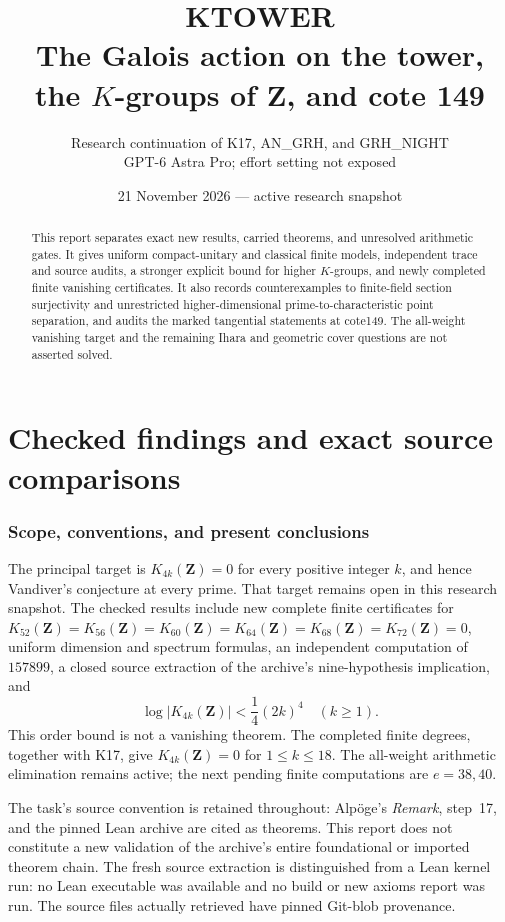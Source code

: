 \documentclass[11pt,a4paper]{article}
\title{KTOWER\\The Galois action on the tower,\\the $K$-groups of $\mathbf Z$, and cote 149}
\author{Research continuation of K17, AN\_GRH, and GRH\_NIGHT\\GPT-6 Astra Pro; effort setting not exposed}
\date{21 November 2026 --- active research snapshot}
\theoremstyle{definition}
\begin{document}
\maketitle
\begin{abstract}
This report separates exact new results, carried theorems, and unresolved
arithmetic gates. It gives uniform compact-unitary and classical finite
models, independent trace and source audits, a stronger explicit bound
for higher $K$-groups, and newly completed finite vanishing certificates.
It also records counterexamples to finite-field section surjectivity
and unrestricted higher-dimensional prime-to-characteristic point
separation, and audits the marked tangential statements at cote149.
The all-weight vanishing target and the remaining Ihara and geometric
cover questions are not asserted solved.
\end{abstract}
\tableofcontents
\clearpage

\part{Checked findings and exact source comparisons}

\section{Scope, conventions, and present conclusions}

The principal target is $K_{4k}(\mathbf Z)=0$ for every positive
integer $k$, and hence Vandiver's conjecture at every prime.
That target remains open in this research snapshot.
The checked results include new complete finite certificates for
$K_{52}(\mathbf Z)=K_{56}(\mathbf Z)=K_{60}(\mathbf Z)=K_{64}(\mathbf Z)=K_{68}(\mathbf Z)=K_{72}(\mathbf Z)=0$, uniform dimension and
spectrum formulas, an independent computation of $157899$, a closed
source extraction of the archive's nine-hypothesis implication, and
\[
 \boxed{\ \log|K_{4k}(\mathbf Z)|<\frac14(2k)^4\quad(k\ge1).\ }
\]
This order bound is not a vanishing theorem. The completed finite
degrees, together with K17, give $K_{4k}(\mathbf Z)=0$ for
$1\le k\le18$. The all-weight arithmetic elimination remains
active; the next pending finite computations are $e=38,40$.

The task's source convention is retained throughout: Alp\"oge's
\emph{Remark}, step~17, and the pinned Lean archive are cited as
theorems. This report does not constitute a new validation of the
archive's entire foundational or imported theorem chain. The fresh
source extraction is distinguished from a Lean kernel run: no Lean
executable was available and no build or new axioms report was run.
The source files actually retrieved have pinned Git-blob provenance.
\end{document}
